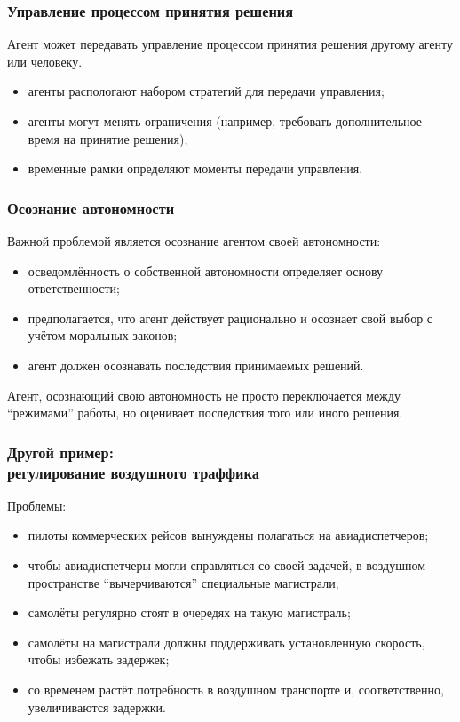 \documentclass{beamer}
\begin{document}
\begin{frame}
  \frametitle{Управление процессом принятия решения}
  Агент может передавать управление процессом принятия решения другому агенту или человеку.
  \begin{itemize}
    \item агенты распологают набором стратегий для передачи управления;
    \item агенты могут менять ограничения (например,
      требовать дополнительное время на принятие решения);
    \item временные рамки определяют моменты передачи управления.
  \end{itemize}
\end{frame}

\begin{frame}
  \frametitle{Осознание автономности}
  Важной проблемой является осознание агентом своей автономности:
  \begin{itemize}
    \item осведомлённость о собственной автономности определяет основу ответственности;
    \item предполагается, что агент действует рационально и осознает свой выбор
      с учётом моральных законов;
    \item агент должен осознавать последствия принимаемых решений.
  \end{itemize}

  Агент, осознающий свою автономность не просто переключается между ``режимами'' работы,
  но оценивает последствия того или иного решения.
\end{frame}

\begin{frame}
  \frametitle{Другой пример: \\ регулирование воздушного траффика}
  Проблемы:
  \begin{itemize}
    \item пилоты коммерческих рейсов вынуждены полагаться на авиадиспетчеров;
    \item чтобы авиадиспетчеры могли справляться со своей задачей, в воздушном
      пространстве ``вычерчиваются'' специальные магистрали;
    \item самолёты регулярно стоят в очередях на такую магистраль;
    \item самолёты на магистрали должны поддерживать установленную скорость,
      чтобы избежать задержек;
    \item со временем растёт потребность в воздушном транспорте и, соответственно,
      увеличиваются задержки.
  \end{itemize}
\end{frame}
\end{document}
